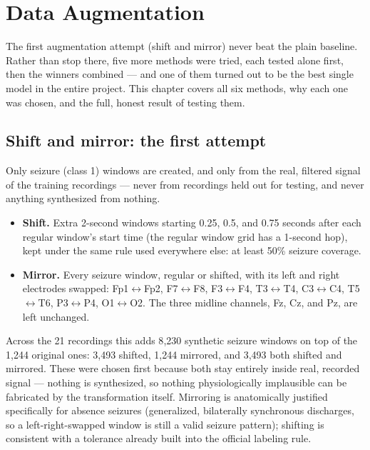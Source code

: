 \chapter{Data Augmentation}
\label{chap:augmentation}

The first augmentation attempt (shift and mirror) never beat the plain baseline. Rather than
stop there, five more methods were tried, each tested alone first, then the winners combined
--- and one of them turned out to be the best single model in the entire project. This chapter
covers all six methods, why each one was chosen, and the full, honest result of testing them.

\section{Shift and mirror: the first attempt}

Only seizure (class 1) windows are created, and only from the real, filtered signal of the
training recordings --- never from recordings held out for testing, and never anything
synthesized from nothing.

\begin{itemize}[leftmargin=1.4em]
  \item \textbf{Shift.} Extra 2-second windows starting 0.25, 0.5, and 0.75 seconds after each
    regular window's start time (the regular window grid has a 1-second hop), kept under the
    same rule used everywhere else: at least 50\% seizure coverage.
  \item \textbf{Mirror.} Every seizure window, regular or shifted, with its left and right
    electrodes swapped: Fp1$\leftrightarrow$Fp2, F7$\leftrightarrow$F8, F3$\leftrightarrow$F4,
    T3$\leftrightarrow$T4, C3$\leftrightarrow$C4, T5$\leftrightarrow$T6, P3$\leftrightarrow$P4,
    O1$\leftrightarrow$O2. The three midline channels, Fz, Cz, and Pz, are left unchanged.
\end{itemize}

Across the 21 recordings this adds 8{,}230 synthetic seizure windows on top of the 1{,}244
original ones: 3{,}493 shifted, 1{,}244 mirrored, and 3{,}493 both shifted and mirrored. These
were chosen first because both stay entirely inside real, recorded signal --- nothing is
synthesized, so nothing physiologically implausible can be fabricated by the transformation
itself. Mirroring is anatomically justified specifically for absence seizures (generalized,
bilaterally synchronous discharges, so a left-right-swapped window is still a valid seizure
pattern); shifting is consistent with a tolerance already built into the official labeling rule.

